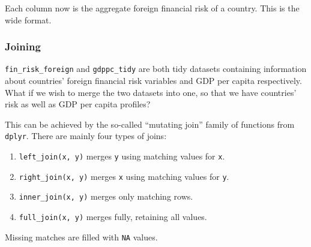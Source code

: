 \documentclass[11pt,]{article}
\newenvironment{Shaded}{\begin{snugshade}}{\end{snugshade}}
\newcommand{\KeywordTok}[1]{\textcolor[rgb]{0.13,0.29,0.53}{\textbf{#1}}}
\newcommand{\DataTypeTok}[1]{\textcolor[rgb]{0.13,0.29,0.53}{#1}}
\newcommand{\DecValTok}[1]{\textcolor[rgb]{0.00,0.00,0.81}{#1}}
\newcommand{\StringTok}[1]{\textcolor[rgb]{0.31,0.60,0.02}{#1}}
\newcommand{\CommentTok}[1]{\textcolor[rgb]{0.56,0.35,0.01}{\textit{#1}}}
\newcommand{\OperatorTok}[1]{\textcolor[rgb]{0.81,0.36,0.00}{\textbf{#1}}}
\newcommand{\NormalTok}[1]{#1}
\providecommand{\tightlist}{%
  \setlength{\itemsep}{0pt}\setlength{\parskip}{0pt}}
\begin{document}
Each column now is the aggregate foreign financial risk of a country.
This is the wide format.

\subsubsection{Joining}\label{joining}

\texttt{fin\_risk\_foreign} and \texttt{gdppc\_tidy} are both tidy
datasets containing information about countries' foreign financial risk
variables and GDP per capita respectively. What if we wish to merge the
two datasets into one, so that we have countries' risk as well as GDP
per capita profiles?

This can be achieved by the so-called ``mutating join'' family of
functions from \texttt{dplyr}. There are mainly four types of joins:

\begin{enumerate}
\def\labelenumi{\arabic{enumi}.}
\tightlist
\item
  \texttt{left\_join(x,\ y)} merges \texttt{y} using matching values for
  \texttt{x}.
\item
  \texttt{right\_join(x,\ y)} merges \texttt{x} using matching values
  for \texttt{y}.
\item
  \texttt{inner\_join(x,\ y)} merges only matching rows.
\item
  \texttt{full\_join(x,\ y)} merges fully, retaining all values.
\end{enumerate}

Missing matches are filled with \texttt{NA} values.

\begin{Shaded}
\end{Shaded}
\end{document}
